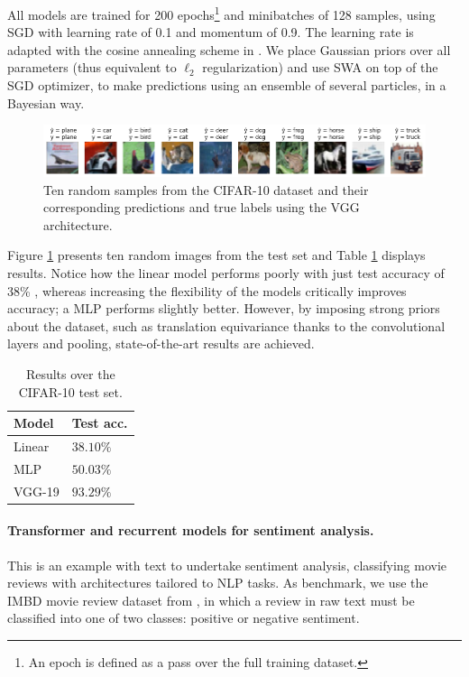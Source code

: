 All models are trained for 200 epochs\footnote{An epoch is defined as a pass over the full training dataset.} and minibatches of 128 samples, using SGD with learning rate of 0.1 and  momentum of 0.9.
The learning rate is adapted with the cosine annealing scheme in  \parencite{loshchilov2016sgdr}. We place Gaussian priors over all parameters (thus equivalent to $\ell_2$ regularization) and use SWA on top of the SGD optimizer, to make predictions using an ensemble of several particles, in a Bayesian way.

\begin{figure}[hbt]
\centering
  \includegraphics[width=1.\linewidth]{figures/cifar.png}
  \caption{Ten random samples from the CIFAR-10 dataset and their corresponding predictions and true labels using the VGG architecture.}
  \label{fig:cifar}
\end{figure}

Figure \ref{fig:cifar} presents ten random images from the test set
and Table \ref{tab:cnn} displays results. Notice how the linear model performs poorly with just test accuracy of 38\% , whereas increasing the flexibility of the models critically improves 
accuracy; a MLP performs slightly better.
However, by imposing strong priors about the dataset, such as translation equivariance thanks to the convolutional layers and pooling, state-of-the-art results are achieved.

\begin{table}[ht]
\caption{Results over the CIFAR-10 test set.}
\centering
\begin{tabular}{ll}
Model & Test acc. \\
\hline
Linear &  $38.10\%$ \\
MLP &  $50.03\%$\\
VGG-19 &  $93.29\%$ 
\end{tabular}
\label{tab:cnn}
\end{table}

\paragraph{Transformer and recurrent models for sentiment analysis.}
This is an example with text to undertake sentiment analysis, classifying movie reviews with architectures tailored to NLP tasks. As benchmark, we use the IMBD movie review dataset 
from \parencite{maas-EtAl:2011:ACL-HLT2011}, in which a review in raw text must be classified into one of two classes: positive or negative
sentiment. 

